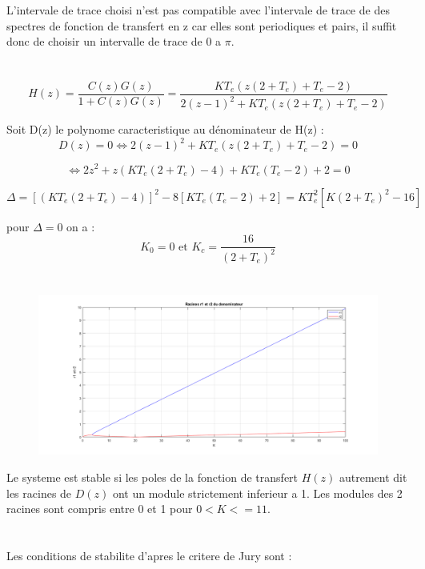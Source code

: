 \documentclass[14pt]{extarticle}
\begin{document}
L'intervale de trace choisi n'est pas compatible avec l'intervale de trace de des spectres de fonction de transfert en z car elles sont periodiques et pairs, il suffit donc de choisir un intervalle de trace de 0 a $\pi$. 

\section{}
\[H(z) = \frac{C(z)G(z)}{1+C(z)G(z)} = \frac{KT_e(z(2+T_e) + T_e - 2)}{2(z-1)^2 + KT_e(z(2+T_e)+T_e - 2)}\] 

Soit D(z) le polynome caracteristique au dénominateur de H(z) :
\[D(z) = 0 \Leftrightarrow 2(z-1)^2 + KT_e(z(2+T_e)+T_e - 2) = 0 \]

\[\Leftrightarrow 2z^2 + z(KT_e(2+T_e) - 4) + KT_e(T_e - 2) +2 = 0 \]

\[\Delta = [(KT_e(2 + T_e)-4)]^2 - 8[KT_e(T_e -2) +2] = KT_e^2[K(2+T_e)^2 - 16] \]

pour $\Delta = 0$ on a : 
\[K_0 = 0 \text{ et } K_c = \frac{16}{(2+T_e)^2}\]
\section{}
\begin{figure}[tbh]
\vspace{0.1cm}
    \centering
    \includegraphics[width=\columnwidth]{tp2_5.png}
    \label{fig:alrc2}
    \footnotesize
    \vspace{\baselineskip}
\end{figure}


Le systeme est stable si les poles de la fonction de transfert $H(z)$ autrement dit les racines de $D(z)$ ont un module strictement inferieur a 1.
\break
Les modules des 2 racines sont compris entre 0 et 1 pour $0<K<=11$.
\section{}
Les conditions de stabilite d'apres le critere de Jury sont :
\end{document}

